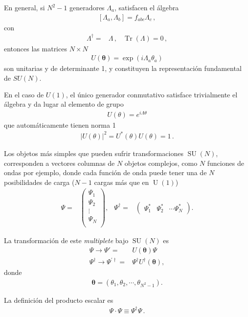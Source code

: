 \begin{frame}
En general, si $N^{2}-1$ generadores $\Lambda_a$, satisfacen el álgebra
\begin{align}
  \left[ \Lambda_a,\Lambda_b \right]=f_{abc}\Lambda_{c}\,,
\end{align}
con
\begin{align}
  \Lambda^{\dagger}=&\Lambda\,, & \operatorname{Tr}(\Lambda)=0\,,
\end{align}
entonces las matrices $N\times N$  
\begin{align}
  U(\boldsymbol{\theta})=\exp\left( i \Lambda_{a}\theta_{a} \right)
\end{align}
son unitarias y de determinante 1, y constituyen la representación fundamental de $SU(N)$.
\end{frame}

En el caso de $U(1)$, el único generador conmutativo satisface trivialmente el álgebra y da lugar al elemento de grupo
\begin{align}
  U(\theta)=e^{i\Lambda \theta}
\end{align}
que automáticamente tienen norma 1
\begin{align*}
|U(\theta)|^2= U^{*}(\theta)U(\theta)=1\,.
\end{align*}

\begin{frame}
Los objetos más simples que pueden sufrir transformaciones  $\operatorname{SU}(N)$, corresponden a vectores columnas de $N$ objetos complejos, como $N$ funciones de ondas por ejemplo, donde cada función de onda puede tener una de $N$ posibilidades de carga ($N-1$ cargas más que en $\operatorname{U}(1)$)
\begin{align}
  \Psi=&
  \begin{pmatrix}
    \Psi_1\\
    \Psi_2\\
    \vdots\\
    \Psi_N\\
  \end{pmatrix},&
  \Psi^{\dagger}=&
  \begin{pmatrix}
    \Psi_1^{*} &
    \Psi_2^{*}& \cdots \Psi_N^{*} 
  \end{pmatrix}.                  
\end{align}

La transformación de este \emph{multiplete} bajo $\operatorname{SU}(N)$ es
\begin{align}
  \Psi\to \Psi'=& U(\boldsymbol{\theta}) \Psi \nonumber\\
  \Psi^{\dagger}\to \Psi^{\prime\dagger} =& \Psi^{\dagger}U^{\dagger}(\boldsymbol{\theta}),
\end{align}
donde
\begin{align}
  \boldsymbol{\theta}=\left(\theta_1,\theta_2,\cdots,\theta_{N^2-1}  \right).
\end{align}

La definición del producto escalar es
\begin{align}
   \Psi \cdot \Psi \equiv \Psi^{\dagger}\Psi\,. 
\end{align}
\end{frame}

